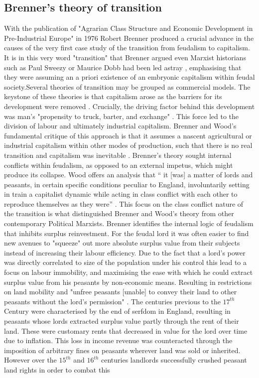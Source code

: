\documentclass[11pt,english]{article}
\begin{document}
\subsection{Brenner's theory of transition}\label{Background and the Brenner debate}
With the publication of "Agrarian Class Structure and Economic Development in Pre-Industrial Europe" in 1976 Robert Brenner produced a crucial advance in the causes of the very first case study of the transition from feudalism to capitalism. It is in this very word "transition" that Brenner argued even Marxist historians such as Paul Sweezy or Maurice Dobb had been led astray \cite[p.41-53]{brenner1977origins}, emphasising that they were assuming an a priori existence of an embryonic capitalism within feudal society.Several theories of transition may be grouped as commercial models. The keystone of these theories is that capitalism arose as the barriers for its development were removed \cite[p.12]{wood2002origin}. Crucially, the driving factor behind this development was man's "propensity to truck, barter, and exchange" \cite{smith1963inquiry}. This force led to the division of labour and ultimately industrial capitalism. Brenner and Wood's fundamental critique of this approach is that it assumes a nascent agricultural or industrial capitalism within other modes of production, such that there is no real transition and capitalism was inevitable \cite[p.51]{wood2002origin}. Brenner's theory sought internal conflicts within feudalism, as opposed to an external impetus, which might produce its collapse. Wood offers an analysis that `` it [was] a matter of lords and peasants, in certain specific conditions peculiar to England, involuntarily setting in train a capitalist dynamic while acting in class conflict with each other to reproduce themselves as they were” \cite[p.52]{wood2002origin}. This focus on the class conflict nature of the transition is what distinguished Brenner and Wood's theory from other contemporary Political Marxists. Brenner identifies the internal logic of feudalism that inhibits surplus reinvestment. For the feudal lord it was often easier to find new avenues to "squeeze" \cite[p.74]{brenner1976agrarian} out more absolute surplus value from their subjects instead of increasing their labour efficiency. Due to the fact that a lord's power was directly correlated to size of the population under his control this lead to a focus on labour immobility, and maximising the ease with which he could extract surplus value from his peasants by non-economic means. Resulting in restrictions on land mobility and "unfree peasants [unable] to convey their land to other peasants without the lord's permission" \cite[p.50]{brenner1976agrarian}. The centuries previous to the $17^{th}$ Century were characterised by the end of serfdom in England, resulting in peasants whose lords extracted surplus value partly through the rent of their land. These were customary rents that decreased in value for the lord over time due to inflation. This loss in income revenue was counteracted through the imposition of arbitrary fines on peasants wherever land was sold or inherited. However over the $15^{th}$ and $16^{th}$ centuries landlords  successfully crushed peasant land rights in order to combat this 
\end{document}
